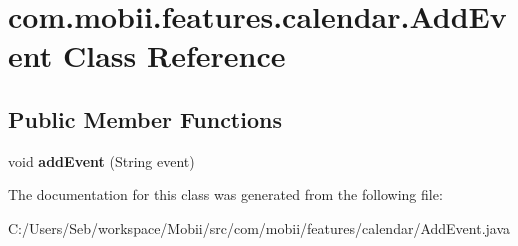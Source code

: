 \hypertarget{classcom_1_1mobii_1_1features_1_1calendar_1_1_add_event}{\section{com.\-mobii.\-features.\-calendar.\-Add\-Event Class Reference}
\label{classcom_1_1mobii_1_1features_1_1calendar_1_1_add_event}
}
\subsection*{Public Member Functions}
\begin{DoxyCompactItemize}
\item 
\hypertarget{classcom_1_1mobii_1_1features_1_1calendar_1_1_add_event_a956e09ac5def4ec5c47815a23d89c991}{void {\bfseries add\-Event} (String event)}\label{classcom_1_1mobii_1_1features_1_1calendar_1_1_add_event_a956e09ac5def4ec5c47815a23d89c991}

\end{DoxyCompactItemize}


The documentation for this class was generated from the following file\-:\begin{DoxyCompactItemize}
\item 
C\-:/\-Users/\-Seb/workspace/\-Mobii/src/com/mobii/features/calendar/Add\-Event.\-java\end{DoxyCompactItemize}
